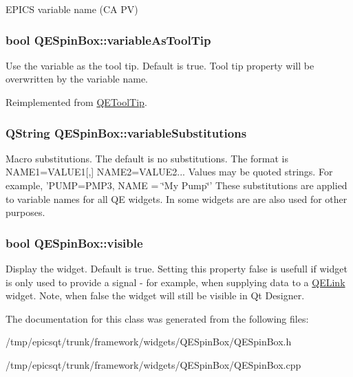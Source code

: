 \label{classQESpinBox_ad3800174538dbb05744842b3f27c609a}
EPICS variable name (CA PV) \hypertarget{classQESpinBox_ac80ceeaecaaf4fb00b28318fa199c188}{
\subsubsection[{variableAsToolTip}]{\setlength{\rightskip}{0pt plus 5cm}bool QESpinBox::variableAsToolTip}}
\label{classQESpinBox_ac80ceeaecaaf4fb00b28318fa199c188}
Use the variable as the tool tip. Default is true. Tool tip property will be overwritten by the variable name. 

Reimplemented from \hyperlink{classQEToolTip}{QEToolTip}.

\hypertarget{classQESpinBox_a7acc6e65f3e878592545d782a7f75913}{
\subsubsection[{variableSubstitutions}]{\setlength{\rightskip}{0pt plus 5cm}QString QESpinBox::variableSubstitutions}}
\label{classQESpinBox_a7acc6e65f3e878592545d782a7f75913}
Macro substitutions. The default is no substitutions. The format is NAME1=VALUE1\mbox{[},\mbox{]} NAME2=VALUE2... Values may be quoted strings. For example, 'PUMP=PMP3, NAME = \char`\"{}My Pump\char`\"{}' These substitutions are applied to variable names for all QE widgets. In some widgets are are also used for other purposes. \hypertarget{classQESpinBox_a478d53c589f3fc19a564641b16352555}{
\subsubsection[{visible}]{\setlength{\rightskip}{0pt plus 5cm}bool QESpinBox::visible}}
\label{classQESpinBox_a478d53c589f3fc19a564641b16352555}
Display the widget. Default is true. Setting this property false is usefull if widget is only used to provide a signal -\/ for example, when supplying data to a \hyperlink{classQELink}{QELink} widget. Note, when false the widget will still be visible in Qt Designer. 

The documentation for this class was generated from the following files:\begin{DoxyCompactItemize}
\item 
/tmp/epicsqt/trunk/framework/widgets/QESpinBox/QESpinBox.h\item 
/tmp/epicsqt/trunk/framework/widgets/QESpinBox/QESpinBox.cpp\end{DoxyCompactItemize}
